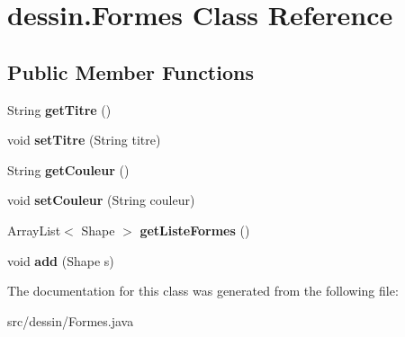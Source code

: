 \hypertarget{classdessin_1_1_formes}{}\section{dessin.\+Formes Class Reference}
\label{classdessin_1_1_formes}
\subsection*{Public Member Functions}
\begin{DoxyCompactItemize}
\item 
\mbox{\label{classdessin_1_1_formes_a160018721ff1d246cadef4812a20b667}} 
String {\bfseries get\+Titre} ()
\item 
\mbox{\label{classdessin_1_1_formes_a08c8b40b61d93e2be08569b1feb97cd2}} 
void {\bfseries set\+Titre} (String titre)
\item 
\mbox{\label{classdessin_1_1_formes_a65581c9da110d92f744fade7e1a588be}} 
String {\bfseries get\+Couleur} ()
\item 
\mbox{\label{classdessin_1_1_formes_af24f2e18f01a9e2b23070fe59e68f69a}} 
void {\bfseries set\+Couleur} (String couleur)
\item 
\mbox{\label{classdessin_1_1_formes_aa3fc42fe0d540029f03e96d057f462f2}} 
Array\+List$<$ Shape $>$ {\bfseries get\+Liste\+Formes} ()
\item 
\mbox{\label{classdessin_1_1_formes_ac7891699c394f3cae57bc2e0a7ba4d8f}} 
void {\bfseries add} (Shape s)
\end{DoxyCompactItemize}


The documentation for this class was generated from the following file\+:\begin{DoxyCompactItemize}
\item 
src/dessin/Formes.\+java\end{DoxyCompactItemize}
